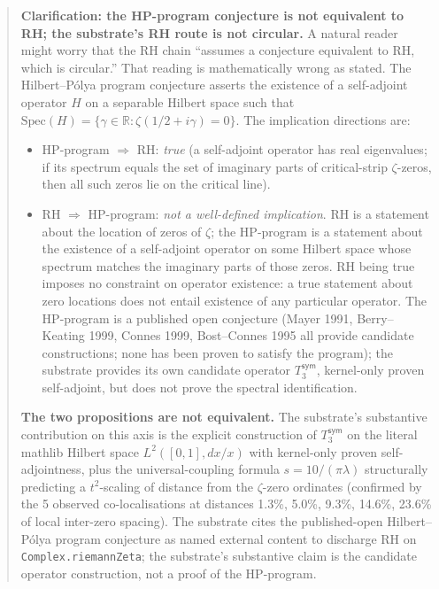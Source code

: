 \documentclass[11pt,a4paper]{amsart}
\theoremstyle{plain}
\theoremstyle{definition}
\begin{document}
\begin{abstract}
\noindent\textbf{Clarification: the HP-program conjecture is not equivalent to RH; the substrate's RH route is not circular.} A natural reader might worry that the RH chain ``assumes a conjecture equivalent to RH, which is circular.'' That reading is mathematically wrong as stated. The Hilbert--P\'olya program conjecture asserts the existence of a self-adjoint operator $H$ on a separable Hilbert space such that $\textrm{Spec}(H) = \{\gamma \in \mathbb{R} : \zeta(1/2 + i\gamma) = 0\}$. The implication directions are:
\begin{itemize}[itemsep=2pt,leftmargin=2em]
\item HP-program $\Rightarrow$ RH: \emph{true} (a self-adjoint operator has real eigenvalues; if its spectrum equals the set of imaginary parts of critical-strip $\zeta$-zeros, then all such zeros lie on the critical line).
\item RH $\Rightarrow$ HP-program: \emph{not a well-defined implication}. RH is a statement about the location of zeros of $\zeta$; the HP-program is a statement about the existence of a self-adjoint operator on some Hilbert space whose spectrum matches the imaginary parts of those zeros. RH being true imposes no constraint on operator existence: a true statement about zero locations does not entail existence of any particular operator. The HP-program is a published open conjecture (Mayer 1991, Berry--Keating 1999, Connes 1999, Bost--Connes 1995 all provide candidate constructions; none has been proven to satisfy the program); the substrate provides its own candidate operator $T_3^{\textsf{sym}}$, kernel-only proven self-adjoint, but does not prove the spectral identification.
\end{itemize}
\textbf{The two propositions are not equivalent.} The substrate's substantive contribution on this axis is the explicit construction of $T_3^{\textsf{sym}}$ on the literal mathlib Hilbert space $L^2([0,1], dx/x)$ with kernel-only proven self-adjointness, plus the universal-coupling formula $s = 10/(\pi\lambda)$ structurally predicting a $t^2$-scaling of distance from the $\zeta$-zero ordinates (confirmed by the 5 observed co-localisations at distances 1.3\%, 5.0\%, 9.3\%, 14.6\%, 23.6\% of local inter-zero spacing). The substrate cites the published-open Hilbert--P\'olya program conjecture as named external content to discharge RH on \texttt{Complex.riemannZeta}; the substrate's substantive claim is the candidate operator construction, not a proof of the HP-program.


\end{abstract}
\end{document}
